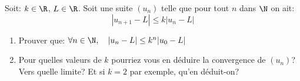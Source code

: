 \begin{exercice}
Soit: $k\in\R$, $L\in\R$. Soit une suite $(u_n)$ telle que pour tout $n$
  dans $\N$ on ait:
\[| u_{n+1}-L| \leq k| u_{n}-L|\]
\begin{enumerate}
\item Prouver que: $\forall n\in\N,\quad |u_{n}-L| \leq k^n |u_{0}-L|$
\item Pour quelles valeurs de $k$ pourriez vous en d\'eduire la
  convergence de $(u_n)$? Vers quelle limite? Et si $k=2$ par exemple,
  qu'en d\'eduit-on?
\end{enumerate}
 
\end{exercice}
